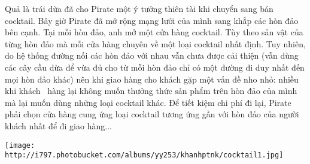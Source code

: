Quả là trái dừa đã cho Pirate một ý tưởng thiên tài khi chuyển sang bán cocktail. Bây giờ Pirate đã mở rộng mạng lưới của mình sang khắp các hòn đảo bên cạnh. Tại mỗi hòn đảo, anh mở một cửa hàng cocktail. Tùy theo sản vật của từng hòn đảo mà mỗi cửa hàng chuyên về một loại cocktail nhất định. Tuy nhiên, do hệ thống đường nối các hòn đảo với nhau vẫn chưa được cải thiện (vẫn dùng các cây cầu dừa để vừa đủ cho từ mỗi hòn đảo chỉ có một đường đi duy nhất đến mọi hòn đảo khác) nên khi giao hàng cho khách gặp một vấn đề nho nhỏ: nhiều khi khách  hàng lại không muốn thưởng thức sản phẩm trên hòn đảo của mình mà lại muốn dùng những loại cocktail khác. Để tiết kiệm chi phí đi lại, Pirate phải chọn cửa hàng cung ứng loại cocktail tương ứng gần với hòn đảo của người khách nhất để đi giao hàng...  




\texttt{[image: http://i797.photobucket.com/albums/yy253/khanhptnk/cocktail1.jpg]}
